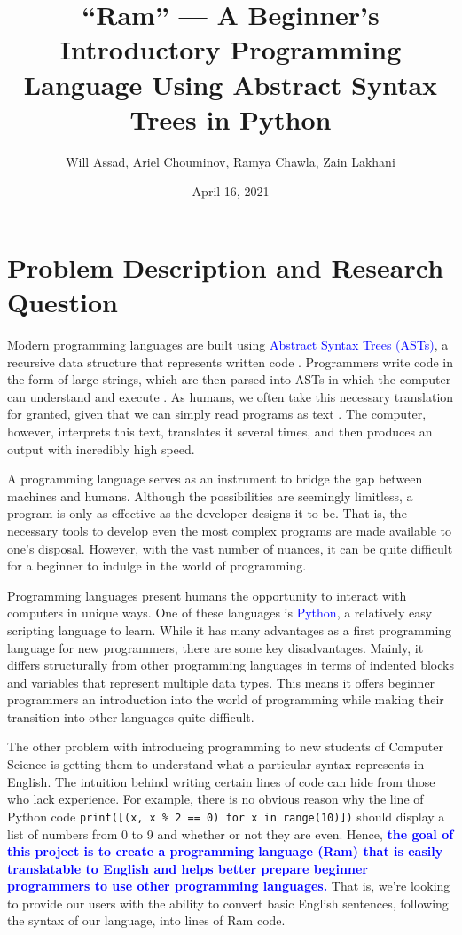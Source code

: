 \documentclass[fontsize=11pt]{article}
\title{``Ram'' --- A Beginner's Introductory Programming Language Using Abstract Syntax Trees in Python}
\author{Will Assad, Ariel Chouminov, Ramya Chawla, Zain Lakhani}
\date{April 16, 2021}
\newcommand{\blue}[1]{\textcolor{blue}{#1}}
\begin{document}
\maketitle

\section*{Problem Description and Research Question}
Modern programming languages are built using \blue{Abstract Syntax Trees (ASTs)}, a recursive data structure that represents written code \cite{david}. Programmers write code in the form of large strings, which are then parsed into ASTs in which the computer can understand and execute \cite{david, ASTs}. As humans, we often take this necessary translation for granted, given that we can simply read programs as text \cite{david}. The computer, however, interprets this text, translates it several times, and then produces an output with incredibly high speed. 

A programming language serves as an instrument to bridge the gap between machines and humans. Although the possibilities are seemingly limitless, a program is only as effective as the developer designs it to be. That is, the necessary tools to develop even the most complex programs are made available to one's disposal. However, with the vast number of nuances, it can be quite difficult for a beginner to indulge in the world of programming.

Programming languages present humans the opportunity to interact with computers in unique ways. One of these languages is \blue{Python}, a relatively easy scripting language to learn. While it has many advantages as a first programming language for new programmers, there are some key disadvantages. Mainly, it differs structurally from other programming languages in terms of indented blocks and variables that represent multiple data types. This means it offers beginner programmers an introduction into the world of programming while making their transition into other languages quite difficult. 

The other problem with introducing programming to new students of Computer Science is getting them to understand what a particular syntax represents in English. The intuition behind writing certain lines of code can hide from those who lack experience. For example, there is no obvious reason why the line of Python code \texttt{print([(x, x \% 2 == 0) for x in range(10)])} should display a list of numbers from 0 to 9 and whether or not they are even. Hence, \blue{\textbf{the goal of this project is to create a programming language (Ram) that is easily translatable to English and helps better prepare beginner programmers to use other programming languages.}} That is, we're looking to provide our users with the ability to convert basic English sentences, following the syntax of our language, into lines of Ram code.
\end{document}
